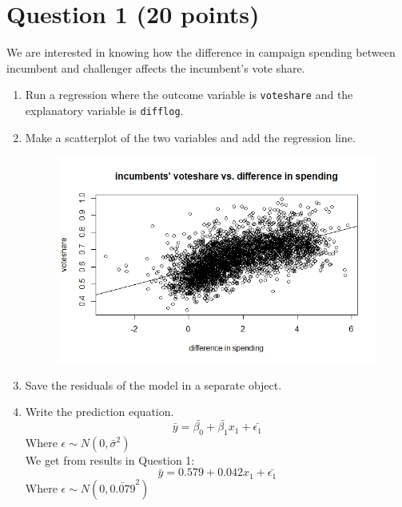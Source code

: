 \documentclass[12pt,letterpaper]{article}
\begin{document}
\section*{Question 1 (20 points)}
\vspace{.25cm}
\noindent We are interested in knowing how the difference in campaign spending between incumbent and challenger affects the incumbent's vote share. 
	\begin{enumerate}
		\item Run a regression where the outcome variable is \texttt{voteshare} and the explanatory variable is \texttt{difflog}.
	    
	    
			\vspace{.5cm}
		
		\item Make a scatterplot of the two variables and add the regression line.
		\begin{figure}[h!]
	    \label{figure1}
	    \includegraphics[width=\textwidth]{Q1.jpeg}
        \end{figure}		
        \vspace{.5cm}
		\item Save the residuals of the model in a separate object.
		
        \vspace{.5cm}		
		\item Write the prediction equation.
		$$\bar{y} = \bar{\beta_0} + \bar{\beta_1}x_1 + \bar{\epsilon_1}$$ Where $\epsilon \sim N(0, \bar{\sigma}^2)$
        \vspace{.5cm}		
		\\We get from results in Question 1:
		$$\bar{y} = 0.579 + 0.042x_1 + \bar{\epsilon_1}$$ Where $\epsilon \sim N(0, \bar{0.079}^2)$
	\end{enumerate}
	
\end{document}

